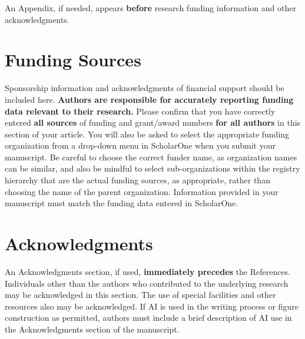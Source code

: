 \documentclass[journal ]{new-aiaa}
\begin{document}
An Appendix, if needed, appears \textbf{before} research funding information and other acknowledgments.

\section*{Funding Sources}

Sponsorship information and acknowledgments of financial support should be included here. \textbf{Authors are responsible for accurately reporting funding data relevant to their research.} Please confirm that you have correctly entered \textbf{all sources} of funding and grant/award numbers \textbf{for all authors} in this section of your article. You will also be asked to select the appropriate funding organization from a drop-down menu in ScholarOne when you submit your manuscript. Be careful to choose the correct funder name, as organization names can be similar, and also be mindful to select sub-organizations within the registry hierarchy that are the actual funding sources, as appropriate, rather than choosing the name of the parent organization. Information provided in your manuscript must match the funding data entered in ScholarOne.

\section*{Acknowledgments}
An Acknowledgments section, if used, \textbf{immediately precedes} the References. Individuals other than the authors who contributed to the underlying research may be acknowledged in this section. The use of special facilities and other resources also may be acknowledged. If AI is used in the writing process or figure construction as permitted, authors must include a brief description of AI use in the Acknowledgments section of the manuscript.


\end{document}
